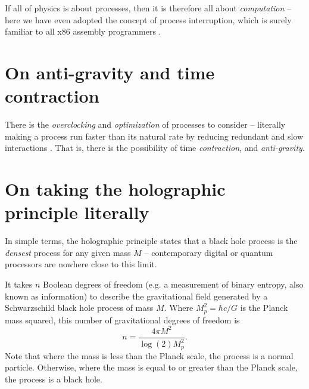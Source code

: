\documentclass[12pt]{article}
\begin{document}
If all of physics is about processes, then it is therefore all about {\textit{computation}} \cite{zuse, wolfram} -- here we have even adopted the concept of process interruption, which is surely familiar to all x86 assembly programmers \cite{abrash}.







\section{On anti-gravity and time contraction}

There is the {\textit{overclocking}} and {\textit{optimization}} of processes to consider -- literally making a process run faster than its natural rate by reducing redundant and slow interactions \cite{wainner, mcconnell, pikus}.
That is, there is the possibility of time {\textit{contraction}}, and {\textit{anti-gravity}}.






\section{On taking the holographic principle literally}

In simple terms, the holographic principle states that a black hole process is the {\textit{densest}} process for any given mass $M$ -- contemporary digital or quantum processors are nowhere close to this limit.

It takes $n$ Boolean degrees of freedom (e.g. a measurement of binary entropy, also known as information) to describe the gravitational field \cite{hooft, susskind, bousso} generated by a Schwarzschild black hole process of mass $M$.
Where $M_p^2 = \hbar c / G$ is the Planck mass squared, this number of gravitational degrees of freedom is
\begin{equation}
n = \frac{4\pi M^2}{ \log(2) M_p^2}.
\end{equation}
Note that where the mass is less than the Planck scale, the process is a normal particle.
Otherwise, where the mass is equal to or greater than the Planck scale, the process is a black hole.
\end{document}
